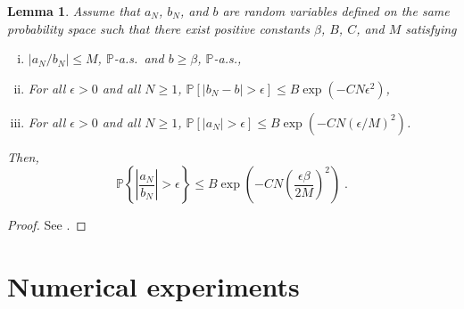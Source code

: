 \documentclass[12pt,draft]{article}
\newcommand{\eqsp}{\;}
\newcommand{\1}{\mathrm{1}}
\newtheorem{lemma}{Lemma}
\begin{document}
\begin{lemma}\label{lem:hoeffding:ratio}
Assume that $a_N$, $b_N$, and $b$ are random variables defined on the same probability space such that there exist positive constants $\beta$, $B$, $C$, and $M$ satisfying
\begin{enumerate}[(i)]
    \item $|a_N/b_N|\leq M$, $\mathbb{P}$-a.s.\ and  $b \geq \beta$, $\mathbb{P}$-a.s.,
    \item For all $\epsilon>0$ and all $N\geq1$, $\mathbb{P}\left[|b_N-b|>\epsilon \right]\leq B \exp\left(-C N \epsilon^2\right)$,
    \item For all $\epsilon>0$ and all $N\geq1$, $\mathbb{P} \left[ |a_N|>\epsilon \right]\leq B \exp\left(-C N \left(\epsilon/M\right)^2\right)$.
\end{enumerate}
Then,
$$
    \mathbb{P}\left\{ \left| \frac{a_N}{b_N} \right| > \epsilon \right\} \leq B \exp{\left(-C N \left(\frac{\epsilon \beta}{2M} \right)^2 \right)} \eqsp.
$$
\end{lemma}
\begin{proof}
See \cite{douc:garivier:moulines:olsson:2011}.
\end{proof}




\section{Numerical experiments}
\label{sec:exp}
\end{document}
